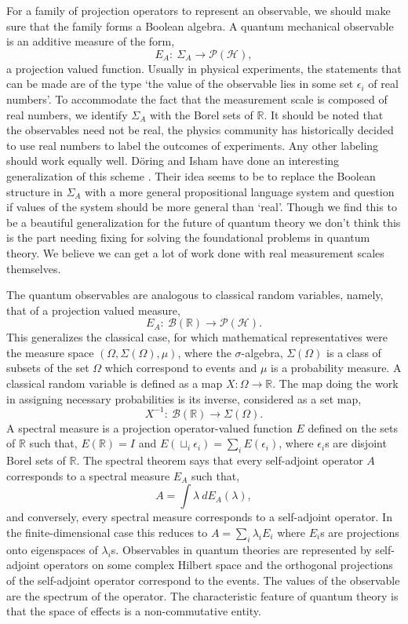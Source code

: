 \documentclass[11pt]{report}
\begin{document}
			For a family of projection operators to represent an observable, we should make sure that the family forms a Boolean algebra. A quantum mechanical observable is an additive measure of the form,
			$$E_A:\: \Sigma_A\to \mathcal{P}(\mathcal{H}),$$
			a projection valued function. Usually in physical experiments, the statements that can be made are of the type `the value of the observable lies in some set $\epsilon_i$ of real numbers'.  To accommodate the fact that the measurement scale is composed of real numbers, we identify $\Sigma_A$ with the Borel sets of $\mathbb{R}$. {It should be noted that the observables need not be real, the physics community has historically decided to use real numbers to label the outcomes of experiments. Any other labeling should work equally well.} D\"oring and Isham have done an interesting generalization of this scheme \cite{doring}. Their idea seems to be to replace the Boolean structure in $\Sigma_A$ with a more general propositional language system and question if values of the system should be more general than `real'. Though we find this to be a beautiful generalization for the future of quantum theory we don't think this is the part needing fixing for solving the foundational problems in quantum theory. We believe we can get a lot of work done with real measurement scales themselves. %
			
			The quantum observables are analogous to classical random variables, namely, that of a projection valued measure,
			$$E_A: \:\mathcal{B}(\mathbb{R})\to \mathcal{P}(\mathcal{H}).$$
			This generalizes the classical case, for which mathematical representatives were the measure space $(\Omega,\Sigma(\Omega),\mu)$, where the $\sigma$-algebra, $\Sigma(\Omega)$ is a class of subsets of the set $\Omega$ which correspond to events and $\mu$ is a probability measure. A classical random variable is defined as a map $X: \Omega\to \mathbb{R}$. The map doing the work in assigning necessary probabilities is its inverse, considered as a set map,
			$$X^{-1}: \:\mathcal{B}(\mathbb{R})\to \Sigma(\Omega).$$
			A spectral measure is a projection operator-valued function $E$ defined on the sets of $\mathbb{R}$ such that, $E(\mathbb{R})=I$ and $E(\sqcup_i \epsilon_i)=\sum_i E(\epsilon_i)$, where $\epsilon_i$s are disjoint Borel sets of $\mathbb{R}$. The spectral theorem says that every self-adjoint operator $A$ corresponds to a spectral measure $E_A$ such that,
			$$A=\int \lambda \:dE_A(\lambda),$$
			and conversely, every spectral measure corresponds to a self-adjoint operator. In the finite-dimensional case this reduces to $A=\sum_i\lambda_i E_i$ where $E_i$s are projections onto eigenspaces of $\lambda_i$s. Observables in quantum theories are represented by self-adjoint operators on some complex Hilbert space and the orthogonal projections of the self-adjoint operator correspond to the events. The values of the observable are the spectrum of the operator. The characteristic feature of quantum theory is that the space of effects is a non-commutative entity.
			
\end{document}
